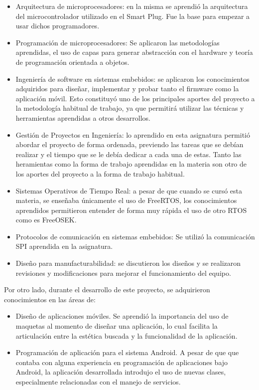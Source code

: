 \begin{itemize}
\item Arquitectura de microprocesadores: en la misma se aprendió la arquitectura del microcontrolador utilizado en el Smart Plug. Fue la base para empezar a usar dichos programadores.
\item Programación de microprocesadores: Se aplicaron las metodologías aprendidas, el uso de capas para generar abstracción con el hardware y teoría de programación orientada a objetos.
\item Ingeniería de software en sistemas embebidos: se aplicaron los conocimientos adquiridos para diseñar, implementar y probar tanto el firmware como la aplicación móvil. Esto constituyó uno de los principales aportes del proyecto a la metodología habitual de trabajo, ya que permitirá utilizar las técnicas y herramientas aprendidas a otros desarrollos.
\item Gestión de Proyectos en Ingeniería: lo aprendido en esta asignatura permitió abordar el proyecto de forma ordenada, previendo las tareas  que se debían realizar y el tiempo que se le debía dedicar a cada una de estas. Tanto las heramientas como la forma de trabajo aprendidas en la materia son otro de los aportes del proyecto a la forma de trabajo habitual.
\item Sistemas Operativos de Tiempo Real: a pesar de que cuando se cursó esta materia, se enseñaba únicamente el uso de FreeRTOS, los conocimientos aprendidos permitieron entender de forma muy rápida el uso de otro RTOS como es FreeOSEK.
\item Protocolos de comunicación en sistemas embebidos: Se utilizó la comunicación SPI aprendida en la asignatura.
\item Diseño para manufacturabilidad: se discutieron los diseños y se realizaron revisiones y modificaciones para mejorar el funcionamiento del equipo.
\end{itemize}


Por otro lado, durante el desarrollo de este proyecto, se adquirieron conocimientos en las áreas de:

\begin{itemize}
\item Diseño de aplicaciones móviles. Se aprendió la importancia del uso de maquetas al momento de diseñar una aplicación, lo cual facilita la articulación entre la estética buscada y la funcionalidad de la aplicación.
\item Programación de aplicación para el sistema Android. A pesar de que que contaba con alguna experiencia en programación de aplicaciones bajo Android, la aplicación desarrollada introdujo el uso de nuevas clases, especialmente relacionadas con el manejo de servicios.
\end{itemize}


